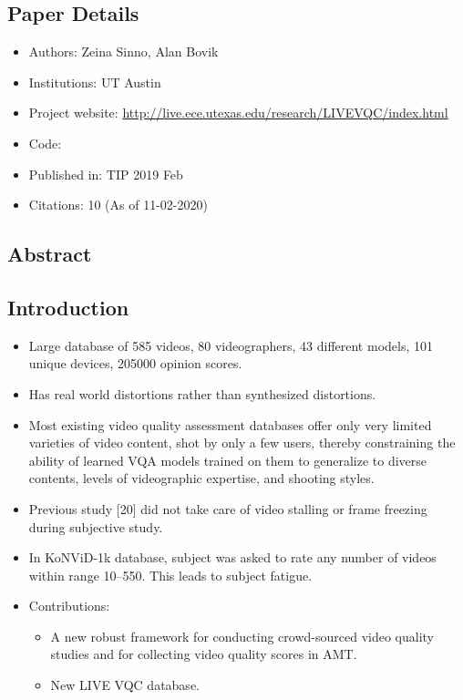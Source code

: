 \documentclass{article}
\begin{document}
    \subsection*{Paper Details}
    \begin{itemize}
        \item Authors: Zeina Sinno, Alan Bovik
        \item Institutions: UT Austin
        \item Project website: \url{http://live.ece.utexas.edu/research/LIVEVQC/index.html}
        \item Code:
        \item Published in: TIP 2019 Feb
        \item Citations: 10 (As of 11-02-2020)
    \end{itemize}

    \subsection*{Abstract}

    \subsection{Introduction}\label{subsec:Large_Scale_Study_of_Perceptual_Video_Quality_(LIVE_VQC_Database):introduction}
    \begin{itemize}
        \item Large database of 585 videos, 80 videographers, 43 different models, 101 unique devices, 205000 opinion scores.
        \item Has real world distortions rather than synthesized distortions.
        \item Most existing video quality assessment databases offer only very limited varieties of video content, shot by only a few users, thereby constraining the ability of learned VQA models trained on them to generalize to diverse contents, levels of videographic expertise, and shooting styles.
        \item Previous study [20] did not take care of video stalling or frame freezing during subjective study.
        \item In KoNViD-1k database, subject was asked to rate any number of videos within range 10--550.
        This leads to subject fatigue.
        \item Contributions:
        \begin{itemize}
            \item A new robust framework for conducting crowd-sourced video quality studies and for collecting video quality scores in AMT\@.
            \item New LIVE VQC database.
        \end{itemize}
    \end{itemize}
\end{document}
